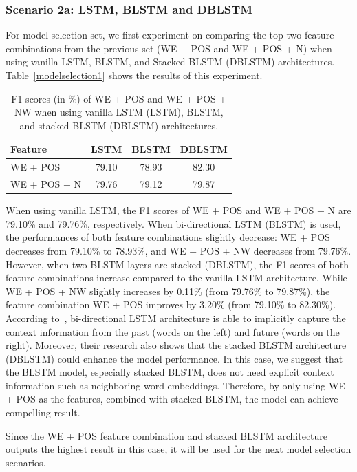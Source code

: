 {{\subsubsection{Scenario 2a: LSTM, BLSTM and DBLSTM}
For model selection set, we first experiment on comparing the top two feature combinations from the previous set (WE + POS and WE + POS + N) when using vanilla LSTM, BLSTM, and Stacked BLSTM (DBLSTM) architectures. Table~\ref{modelselection1} shows the results of this experiment.

\begin{table}
	\caption{F1 scores (in \%) of WE + POS and WE + POS + NW when using vanilla LSTM (LSTM), BLSTM, and stacked BLSTM (DBLSTM) architectures.}
	\centering
	\label{tab:modelselection1}
	\begin{tabular}{lccc}
		\hline
		Feature & LSTM & BLSTM & DBLSTM \\
		\hline		\hline
		WE + POS & 79.10 & 78.93 & 82.30 \\
		WE + POS + N & 79.76 & 79.12 & 79.87 \\
		\hline
	\end{tabular}

\end{table}

When using vanilla LSTM, the F1 scores of WE + POS and WE + POS + N are 79.10\% and 79.76\%, respectively. When bi-directional LSTM (BLSTM) is used, the performances of both feature combinations slightly decrease: WE + POS decreases from 79.10\% to 78.93\%, and WE + POS + NW decreases from 79.76\%. However, when two BLSTM layers are stacked (DBLSTM), the F1 scores of both feature combinations increase compared to the vanilla LSTM architecture. While WE + POS + NW slightly increases by 0.11\% (from 79.76\% to 79.87\%), the feature combination WE + POS improves by 3.20\% (from 79.10\% to 82.30\%). According to~\cite{zhou2015end}, bi-directional LSTM architecture is able to implicitly capture the context information from the past (words on the left) and future (words on the right). Moreover, their research also shows that the stacked BLSTM architecture (DBLSTM) could enhance the model performance. In this case, we suggest that the BLSTM model, especially stacked BLSTM, does not need explicit context information such as neighboring word embeddings. Therefore, by only using WE + POS as the features, combined with stacked BLSTM, the model can achieve compelling result.

Since the WE + POS feature combination and stacked BLSTM architecture outputs the highest result in this case, it will be used for the next model selection scenarios.

}}
